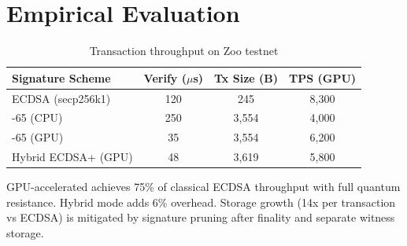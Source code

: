 \section{Empirical Evaluation}


\begin{table}[h]
\centering
\begin{tabular}{lccc}
\toprule
\textbf{Signature Scheme} & \textbf{Verify ($\mu$s)} & \textbf{Tx Size (B)} & \textbf{TPS (GPU)} \\
\midrule
ECDSA (secp256k1) & 120 & 245 & 8,300 \\
\MLDSA{}-65 (CPU) & 250 & 3,554 & 4,000 \\
\MLDSA{}-65 (GPU) & 35 & 3,554 & 6,200 \\
Hybrid ECDSA+\MLDSA{} (GPU) & 48 & 3,619 & 5,800 \\
\bottomrule
\end{tabular}
\caption{Transaction throughput on Zoo testnet}
\label{tab:tx-throughput}
\end{table}

GPU-accelerated \MLDSA{} achieves 75\% of classical ECDSA throughput with full quantum resistance. Hybrid mode adds 6\% overhead. Storage growth (14x per transaction vs ECDSA) is mitigated by signature pruning after finality and separate witness storage.


